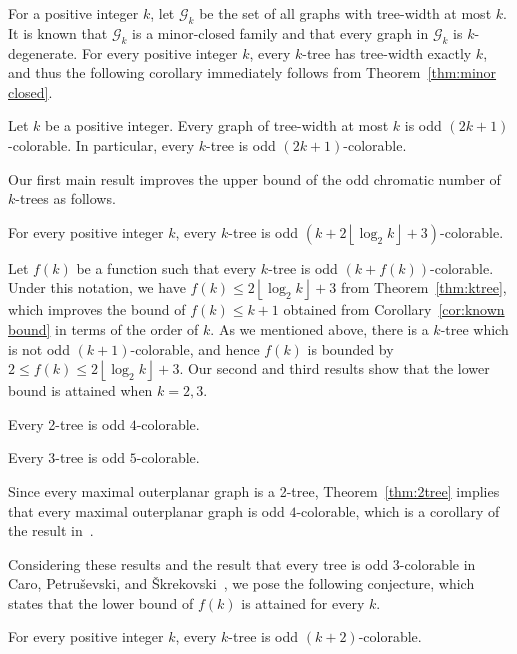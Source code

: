 For a positive integer $k$, let $\mathcal{G}_k$ be the set of all graphs with tree-width at most $k$.
It is known that $\mathcal{G}_k$ is a minor-closed family and that every graph in $\mathcal{G}_k$ is $k$-degenerate.
For every positive integer $k$, every $k$-tree has tree-width exactly $k$, and thus the following corollary immediately follows from Theorem~\ref{thm:minor closed}.

\begin{corollary}\label{cor:known bound}
  Let $k$ be a positive integer.
  Every graph of tree-width at most $k$ is odd $(2k+1)$-colorable.
  In particular, every $k$-tree is odd $(2k+1)$-colorable.
\end{corollary}

Our first main result improves the upper bound of the odd chromatic number of $k$-trees as follows.

\begin{theorem}\label{thm:ktree}
  For every positive integer $k$, every $k$-tree is odd $\left(k+2\left\lfloor\log_2 k\right\rfloor+3\right)$-colorable.
\end{theorem}

Let $f(k)$ be a function such that every $k$-tree is odd $(k+f(k))$-colorable.
Under this notation, we have $f(k)\leq 2\left\lfloor\log_2 k\right\rfloor+3$ from Theorem~\ref{thm:ktree}, which improves the bound of $f(k)\leq k+1$ obtained from Corollary~\ref{cor:known bound} in terms of the order of $k$.
As we mentioned above, there is a $k$-tree which is not odd $(k+1)$-colorable, and hence $f(k)$ is bounded by $2\leq f(k)\leq 2\left\lfloor\log_2 k\right\rfloor+3$.
Our second and third results show that the lower bound is attained when $k=2,3$.

\begin{theorem}\label{thm:2tree}
  Every 2-tree is odd $4$-colorable.
\end{theorem}

\begin{theorem}\label{thm:3tree}
  Every 3-tree is odd $5$-colorable.
\end{theorem}

Since every maximal outerplanar graph is a 2-tree, Theorem~\ref{thm:2tree} implies that every maximal outerplanar graph is odd $4$-colorable, which is a corollary of the result in~\cite{KMOOT2024+}.

Considering these results and the result that every tree is odd $3$-colorable in Caro, Petru\v{s}evski, and \v{S}krekovski~\cite{CPS2022}, we pose the following conjecture, which states that the lower bound of $f(k)$ is attained for every $k$.

\begin{conjecture}\label{conj:ktree}
  For every positive integer $k$, every $k$-tree is odd $(k+2)$-colorable.
\end{conjecture}
